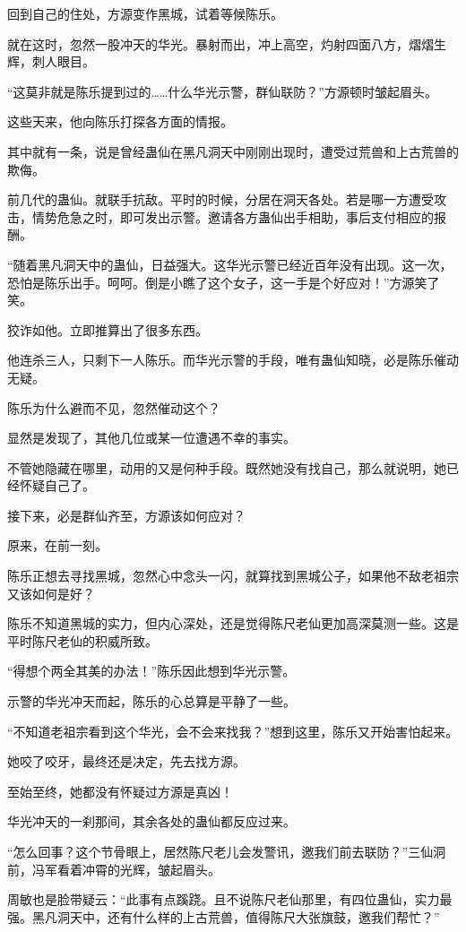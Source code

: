 \begin{this_body}
回到自己的住处，方源变作黑城，试着等候陈乐。

就在这时，忽然一股冲天的华光。暴射而出，冲上高空，灼射四面八方，熠熠生辉，刺人眼目。

“这莫非就是陈乐提到过的……什么华光示警，群仙联防？”方源顿时皱起眉头。

这些天来，他向陈乐打探各方面的情报。

其中就有一条，说是曾经蛊仙在黑凡洞天中刚刚出现时，遭受过荒兽和上古荒兽的欺侮。

前几代的蛊仙。就联手抗敌。平时的时候，分居在洞天各处。若是哪一方遭受攻击，情势危急之时，即可发出示警。邀请各方蛊仙出手相助，事后支付相应的报酬。

“随着黑凡洞天中的蛊仙，日益强大。这华光示警已经近百年没有出现。这一次，恐怕是陈乐出手。呵呵。倒是小瞧了这个女子，这一手是个好应对！”方源笑了笑。

狡诈如他。立即推算出了很多东西。

他连杀三人，只剩下一人陈乐。而华光示警的手段，唯有蛊仙知晓，必是陈乐催动无疑。

陈乐为什么避而不见，忽然催动这个？

显然是发现了，其他几位或某一位遭遇不幸的事实。

不管她隐藏在哪里，动用的又是何种手段。既然她没有找自己，那么就说明，她已经怀疑自己了。

接下来，必是群仙齐至，方源该如何应对？

原来，在前一刻。

陈乐正想去寻找黑城，忽然心中念头一闪，就算找到黑城公子，如果他不敌老祖宗又该如何是好？

陈乐不知道黑城的实力，但内心深处，还是觉得陈尺老仙更加高深莫测一些。这是平时陈尺老仙的积威所致。

“得想个两全其美的办法！”陈乐因此想到华光示警。

示警的华光冲天而起，陈乐的心总算是平静了一些。

“不知道老祖宗看到这个华光，会不会来找我？”想到这里，陈乐又开始害怕起来。

她咬了咬牙，最终还是决定，先去找方源。

至始至终，她都没有怀疑过方源是真凶！

华光冲天的一刹那间，其余各处的蛊仙都反应过来。

“怎么回事？这个节骨眼上，居然陈尺老儿会发警讯，邀我们前去联防？”三仙洞前，冯军看着冲霄的光辉，皱起眉头。

周敏也是脸带疑云：“此事有点蹊跷。且不说陈尺老仙那里，有四位蛊仙，实力最强。黑凡洞天中，还有什么样的上古荒兽，值得陈尺大张旗鼓，邀我们帮忙？”


\end{this_body}
